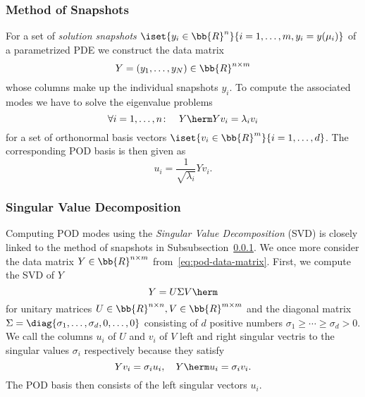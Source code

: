 \subsubsection{Method of Snapshots}\label{subsubsec:pod-snapshots}

For a set of \emph{solution snapshots} $\iset{y_i \in \bb{R}^n}{i = 1, \dots, m, y_i = y(\mu_i)}$ of a parametrized PDE we construct the data matrix
\begin{equation}\label{eq:pod-data-matrix}
    Y = \left( y_1, \dots, y_N \right) \in \bb{R}^{n \times m}
\end{equation}
whose columns make up the individual snapshots $y_i$.
To compute the associated modes we have to solve the eigenvalue problems
\begin{equation*}
    \forall i = 1, \dots, n \colon\quad Y\herm Y v_i = \lambda_i v_i
\end{equation*}
for a set of orthonormal basis vectors $\iset{v_i \in \bb{R}^m}{i = 1, \dots, d}$.
The corresponding POD basis is then given as
\begin{equation*}
    u_i = \frac{1}{\sqrt{\lambda_i}} Y v_i.
\end{equation*}

\subsubsection{Singular Value Decomposition}\label{subsubsec:pod-svd}

Computing POD modes using the \emph{Singular Value Decomposition} (SVD) is closely linked to the method of snapshots in Subsubsection~\ref{subsubsec:pod-snapshots}.
We once more consider the data matrix $Y \in \bb{R}^{n \times m}$ from~\eqref{eq:pod-data-matrix}.
First, we compute the SVD of $Y$
\begin{equation*}
    Y = U \Sigma V\herm
\end{equation*}
for unitary matrices $U \in \bb{R}^{n \times n}, V \in \bb{R}^{m \times m}$ and the diagonal matrix $\Sigma = \diag{\sigma_1, \dots, \sigma_d, 0, \dots, 0}$ consisting of $d$ positive numbers $\sigma_1 \geq \cdots \geq \sigma_d > 0$.
We call the columns $u_i$ of $U$ and $v_i$ of $V$ left and right singular vectris to the singular values $\sigma_i$ respectively because they satisfy
\begin{equation*}
    Y v_i = \sigma_i u_i,\quad Y\herm u_i = \sigma_i v_i.
\end{equation*}
The POD basis then consists of the left singular vectors $u_i$.

